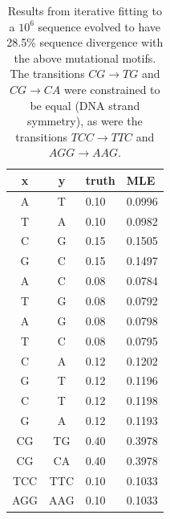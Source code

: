 \documentclass{article}
\newcommand{\nA}{\mbox{A}}  %
\newcommand{\nC}{\mbox{C}}
\newcommand{\nG}{\mbox{G}}
\newcommand{\nT}{\mbox{T}}
\theoremstyle{plain}
\theoremstyle{definition}
\begin{document}

\begin{table}
  \begin{center}
        \begin{tabular}{c@{\quad$\to$\quad}c@{\quad at rate\quad }ll}
          \hline
            x & y & truth & MLE \\ 
          \hline
          \nA  &   \nT           & 0.10 & 0.0996 \\ 
          \nT  &   \nA           & 0.10 & 0.0982 \\ 
          \nC  &   \nG           & 0.15 & 0.1505 \\ 
          \nG  &   \nC           & 0.15 & 0.1497 \\ 
          \nA  &   \nC           & 0.08 & 0.0784 \\ 
          \nT  &   \nG           & 0.08 & 0.0792 \\ 
          \nA  &   \nG           & 0.08 & 0.0798 \\ 
          \nT  &   \nC           & 0.08 & 0.0795 \\ 
          \nC  &   \nA           & 0.12 & 0.1202 \\ 
          \nG  &   \nT           & 0.12 & 0.1196 \\ 
          \nC  &   \nT           & 0.12 & 0.1198 \\ 
          \nG  &   \nA           & 0.12 & 0.1193 \\ 
       \nC\nG  &  \nT\nG         & 0.40 & 0.3978 \\ 
       \nC\nG  &  \nC\nA         & 0.40 & 0.3978 \\ 
    \nT\nC\nC  &  \nT\nT\nC      & 0.10 & 0.1033 \\ 
    \nA\nG\nG  &  \nA\nA\nG      & 0.10 & 0.1033 \\ 
           \hline
        \end{tabular}
  \end{center}
  \caption{ Results from iterative fitting to a $10^6$ sequence evolved to have 28.5\% sequence divergence
    with the above mutational motifs. The transitions $CG \to TG$ and $CG \to CA$ 
    were constrained to be equal (DNA strand symmetry),
    as were the transitions $TCC \to TTC$ and $AGG \to AAG$.
    \label{tab:cpg_results} }
\end{table}
\end{document}
